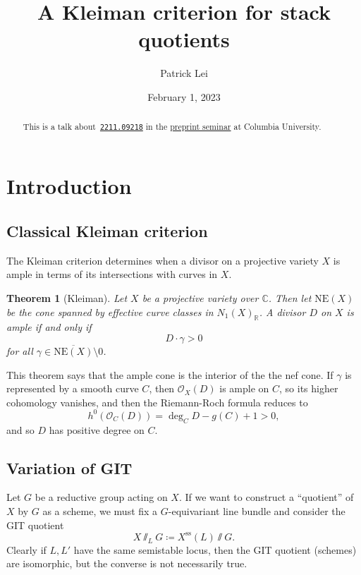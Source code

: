 \documentclass{amsart}
\title{A Kleiman criterion for stack quotients}
\author{Patrick Lei}
\date{February 1, 2023}
\newtheorem{thm}{Theorem}[section]
\theoremstyle{definition}
\theoremstyle{remark}
\theoremstyle{plain}
\theoremstyle{definition}
\theoremstyle{remark}
\newcommand{\R}{\mathbb{R}}
\newcommand{\C}{\mathbb{C}}
\newcommand{\mc}[1]{\mathcal{#1}}
\newcommand{\mr}[1]{\mathrm{#1}}
\newcommand{\ol}[1]{\overline{#1}}
\newcommand{\1}{\mathbf{1}}
\newcommand{\2}{\mathbf{2}}
\newcommand{\3}{\mathbf{3}}
\begin{document}
    
\maketitle

\begin{abstract}
    This is a talk about~\href{https://arxiv.org/pdf/2211.09218.pdf}{\texttt{2211.09218}} in the \href{https://www.math.columbia.edu/~tpad/preprintS2023.html}{preprint seminar} at Columbia University. 
\end{abstract}

\section{Introduction}

\subsection{Classical Kleiman criterion} The Kleiman criterion determines when a divisor on a projective variety $X$ is ample in terms of its intersections with curves in $X$.

\begin{thm}[Kleiman]
    Let $X$ be a projective variety over $\C$. Then let $\mr{NE}(X)$ be the cone spanned by effective curve classes in $N_1(X)_{\R}$. A divisor $D$ on $X$ is ample if and only if
    \[ D \cdot \gamma > 0 \]
    for all $\gamma \in \ol{ \mr{NE}(X) } \setminus 0$.
\end{thm}

This theorem says that the ample cone is the interior of the the nef cone. If $\gamma$ is represented by a smooth curve $C$, then $\mc{O}_X(D)$ is ample on $C$, so its higher cohomology vanishes, and then the Riemann-Roch formula reduces to
\[ h^0(\mc{O}_C(D)) = \deg_C D - g(C) + 1 > 0, \]
and so $D$ has positive degree on $C$.

\subsection{Variation of GIT}

Let $G$ be a reductive group acting on $X$. If we want to construct a ``quotient'' of $X$ by $G$ as a scheme, we must fix a $G$-equivariant line bundle and consider the GIT quotient
\[ X \sslash_L G \coloneqq X^{\mr{ss}}(L) \sslash G. \]
Clearly if $L, L'$ have the same semistable locus, then the GIT quotient (schemes) are isomorphic, but the converse is not necessarily true.
\end{document}
